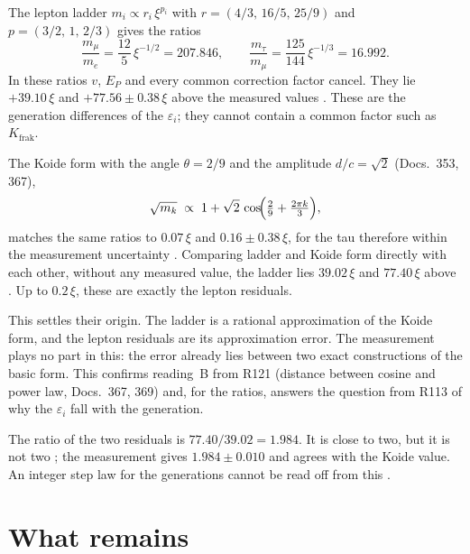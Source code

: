 The lepton ladder $m_i\propto r_i\,\xi^{p_i}$ with $r=(4/3,\,16/5,\,25/9)$ and $p=(3/2,\,1,\,2/3)$
gives the ratios
\begin{equation}
  \frac{m_\mu}{m_e}=\frac{12}{5}\,\xi^{-1/2}=207.846,\qquad
  \frac{m_\tau}{m_\mu}=\frac{125}{144}\,\xi^{-1/3}=16.992 .
\end{equation}
In these ratios $v$, $E_P$ and every common correction factor cancel. They lie $+39.10\,\xi$ and
$+77.56\pm0.38\,\xi$ above the measured values \KM. These are the generation differences of the
$\varepsilon_i$; they cannot contain a common factor such as $K_{\text{frak}}$.

The Koide form with the angle $\theta=2/9$ and the amplitude $d/c=\sqrt2$ (Docs.~353, 367),
\begin{equation}
  \sqrt{m_k}\;\propto\;1+\sqrt2\,\cos\!\Bigl(\tfrac29+\tfrac{2\pi k}{3}\Bigr),
\end{equation}
matches the same ratios to $0.07\,\xi$ and $0.16\pm0.38\,\xi$, for the tau therefore within the
measurement uncertainty \KM. Comparing ladder and Koide form directly with each other, without any
measured value, the ladder lies $39.02\,\xi$ and $77.40\,\xi$ above \KM. Up to $0.2\,\xi$, these are
exactly the lepton residuals.

This settles their origin. The ladder is a rational approximation of the Koide form, and the lepton
residuals are its approximation error. The measurement plays no part in this: the error already lies
between two exact constructions of the basic form. This confirms reading~B from R121 (distance
between cosine and power law, Docs.~367, 369) and, for the ratios, answers the question from R113 of
why the $\varepsilon_i$ fall with the generation.

The ratio of the two residuals is $77.40/39.02=1.984$. It is close to two, but it is not two \KM; the
measurement gives $1.984\pm0.010$ and agrees with the Koide value. An integer step law for the
generations cannot be read off from this \XM.

\section{What remains}

